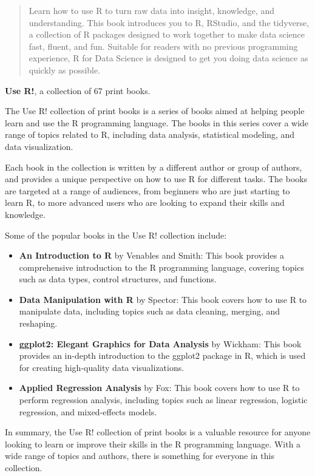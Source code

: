 \documentclass[
]{book}
\providecommand{\tightlist}{%
  \setlength{\itemsep}{0pt}\setlength{\parskip}{0pt}}
\begin{document}
\begin{quote}
Learn how to use R to turn raw data into insight, knowledge, and understanding.
This book introduces you to R, RStudio, and the tidyverse, a collection of R
packages designed to work together to make data science fast, fluent, and fun.
Suitable for readers with no previous programming experience, R for Data
Science is designed to get you doing data science as quickly as possible.
\end{quote}

\textbf{Use R!}, a collection of 67 print books.

The Use R! collection of print books is a series of books aimed at helping people learn and use the R programming language. The books in this series cover a wide range of topics related to R, including data analysis, statistical modeling, and data visualization.

Each book in the collection is written by a different author or group of authors, and provides a unique perspective on how to use R for different tasks. The books are targeted at a range of audiences, from beginners who are just starting to learn R, to more advanced users who are looking to expand their skills and knowledge.

Some of the popular books in the Use R! collection include:

\begin{itemize}
\tightlist
\item
  \textbf{An Introduction to R} by Venables and Smith: This book provides a comprehensive introduction to the R programming language, covering topics such as data types, control structures, and functions.
\item
  \textbf{Data Manipulation with R} by Spector: This book covers how to use R to manipulate data, including topics such as data cleaning, merging, and reshaping.
\item
  \textbf{ggplot2: Elegant Graphics for Data Analysis} by Wickham: This book provides an in-depth introduction to the ggplot2 package in R, which is used for creating high-quality data visualizations.
\item
  \textbf{Applied Regression Analysis} by Fox: This book covers how to use R to perform regression analysis, including topics such as linear regression, logistic regression, and mixed-effects models.
\end{itemize}

In summary, the Use R! collection of print books is a valuable resource for anyone looking to learn or improve their skills in the R programming language. With a wide range of topics and authors, there is something for everyone in this collection.
\end{document}
